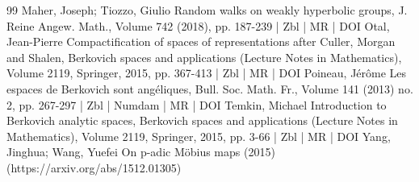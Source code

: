 \documentclass[10pt]{amsart}
\theoremstyle{definition}\newtheorem{defi}[theo]{Definition}\newtheorem{rema}[theo]{Remark}\newtheorem{exam}[theo]{Example}\newtheorem{exem}[theo]{Example}\newtheorem{nota}[theo]{Notation}
\begin{document}
\begin{thebibliography}{99}
Maher, Joseph; Tiozzo, Giulio Random walks on weakly hyperbolic groups, J. Reine Angew. Math., Volume 742 (2018), pp. 187-239 | Zbl | MR | DOI
Otal, Jean-Pierre Compactification of spaces of representations after Culler, Morgan and Shalen, Berkovich spaces and applications (Lecture Notes in Mathematics), Volume 2119, Springer, 2015, pp. 367-413 | Zbl | MR | DOI
Poineau, Jérôme Les espaces de Berkovich sont angéliques, Bull. Soc. Math. Fr., Volume 141 (2013) no. 2, pp. 267-297 | Zbl | Numdam | MR | DOI
Temkin, Michael Introduction to Berkovich analytic spaces, Berkovich spaces and applications (Lecture Notes in Mathematics), Volume 2119, Springer, 2015, pp. 3-66 | Zbl | MR | DOI
Yang, Jinghua; Wang, Yuefei On p-adic Möbius maps (2015) (https://arxiv.org/abs/1512.01305)
\end{thebibliography}
\end{document}
